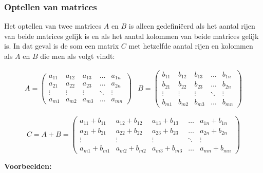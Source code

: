 \subsubsection{Optellen van matrices}

Het optellen van twee matrices $A$ en $B$ is alleen gedefini\"{e}erd als het aantal rijen van beide matrices gelijk is en als het aantal kolommen van beide matrices gelijk is. In dat geval is de som een matrix $C$ met hetzelfde aantal rijen en kolommen als $A$ en $B$ die men als volgt vindt:

\[ 
\begin{array}{ll}
A= \left( \begin{matrix}
a_{11} & a_{12} & a_{13} & \ldots & a_{1n} \\
a_{21} & a_{22} & a_{23} & \ldots & a_{2n} \\
\vdots & \vdots & \vdots & \ddots & \vdots \\
a_{m1} & a_{m2} & a_{m3} & \ldots & a_{mn}
\end{matrix} \right) &
B= \left( \begin{matrix}
b_{11} & b_{12} & b_{13} & \ldots & b_{1n} \\
b_{21} & b_{22} & b_{23} & \ldots & b_{2n} \\
\vdots & \vdots & \vdots & \ddots & \vdots \\
b_{m1} & b_{m2} & b_{m3} & \ldots & b_{mn}
\end{matrix} \right)
\end{array}
\]

\[
C=A+B=\left( \begin{matrix}
a_{11}+b_{11} & a_{12}+b_{12} & a_{13}+b_{13} & \ldots & a_{1n}+b_{1n} \\
a_{21}+b_{21} & a_{22}+b_{22} & a_{23}+b_{23} & \ldots & a_{2n}+b_{2n} \\
\vdots & \vdots & \vdots & \ddots & \vdots \\
a_{m1}+b_{m1} & a_{m2}+b_{m2} & a_{m3}+b_{m3} & \ldots & a_{mn}+b_{mn}
\end{matrix} \right)
\]

{\bf Voorbeelden:}

